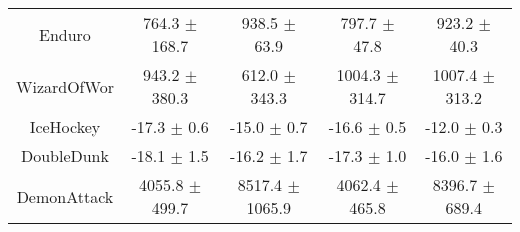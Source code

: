 \begin{table}[H]
{\begin{tabular}{ccccc}
Enduro        &     764.3 $\pm$ 168.7 &      938.5 $\pm$ 63.9 &      797.7 $\pm$ 47.8 &      923.2 $\pm$ 40.3 \\
WizardOfWor   &     943.2 $\pm$ 380.3 &     612.0 $\pm$ 343.3 &    1004.3 $\pm$ 314.7 &    1007.4 $\pm$ 313.2 \\
IceHockey     &       -17.3 $\pm$ 0.6 &       -15.0 $\pm$ 0.7 &       -16.6 $\pm$ 0.5 &       -12.0 $\pm$ 0.3 \\
DoubleDunk    &       -18.1 $\pm$ 1.5 &       -16.2 $\pm$ 1.7 &       -17.3 $\pm$ 1.0 &       -16.0 $\pm$ 1.6 \\
DemonAttack   &    4055.8 $\pm$ 499.7 &   8517.4 $\pm$ 1065.9 &    4062.4 $\pm$ 465.8 &    8396.7 $\pm$ 689.4 \\
\bottomrule
\end{tabular}}
\end{table}

